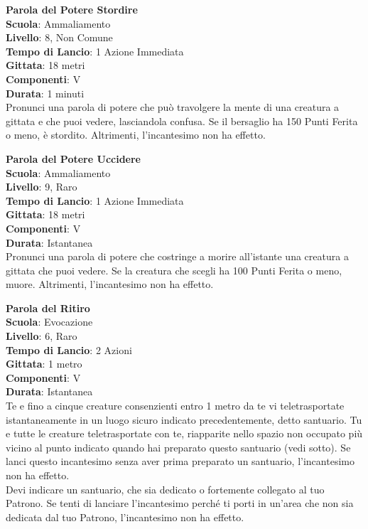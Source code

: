 \begin{multicols}{2}
\medskip\textbf{Parola del Potere Stordire}\\
\textbf{Scuola}: Ammaliamento\\
\textbf{Livello}: 8, Non Comune\\
\textbf{Tempo di Lancio}: 1 Azione Immediata\\
\textbf{Gittata}: 18 metri\\
\textbf{Componenti}: V\\
\textbf{Durata}: 1 minuti\\
Pronunci una parola di potere che può travolgere la mente di una creatura a gittata e che puoi vedere, lasciandola confusa. Se il bersaglio ha 150 Punti Ferita o meno, è stordito. Altrimenti, l'incantesimo non ha effetto.

\medskip\textbf{Parola del Potere Uccidere}\\
\textbf{Scuola}: Ammaliamento\\
\textbf{Livello}: 9, Raro\\
\textbf{Tempo di Lancio}: 1 Azione Immediata\\
\textbf{Gittata}: 18 metri\\
\textbf{Componenti}: V\\
\textbf{Durata}: Istantanea\\
Pronunci una parola di potere che costringe a morire all'istante una creatura a gittata che puoi vedere. Se la creatura che scegli ha 100 Punti Ferita o meno, muore. Altrimenti, l'incantesimo non ha effetto.

\medskip\textbf{Parola del Ritiro}\\
\textbf{Scuola}: Evocazione\\
\textbf{Livello}: 6, Raro\\
\textbf{Tempo di Lancio}: 2 Azioni\\
\textbf{Gittata}: 1 metro\\
\textbf{Componenti}: V\\
\textbf{Durata}: Istantanea\\
Te e fino a cinque creature consenzienti entro 1 metro da te vi teletrasportate istantaneamente in un luogo sicuro indicato precedentemente, detto santuario. Tu e tutte le creature teletrasportate con te, riapparite nello spazio non occupato più vicino al punto indicato quando hai preparato questo santuario (vedi sotto). Se lanci questo incantesimo senza aver prima preparato un santuario, l'incantesimo non ha effetto.\\
Devi indicare un santuario, che sia dedicato o fortemente collegato al tuo Patrono. Se tenti di lanciare l'incantesimo perché ti porti in un'area che non sia dedicata dal tuo Patrono, l'incantesimo non ha effetto.


\end{multicols}

